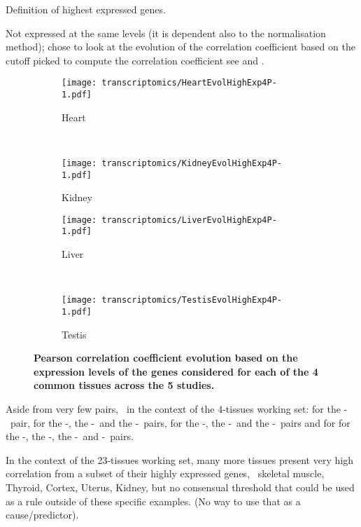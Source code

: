 Definition of highest expressed genes.

Not expressed at the same levels (it is dependent also to the normalisation
method);
chose to look at the evolution of the correlation coefficient based on
the cutoff picked to compute the correlation coefficient see 
and .

\begin{sidewaysfigure}[htpb]
    \centering
    \begin{subfigure}[b]{0.50\textwidth}\centering
        \texttt{[image: transcriptomics/HeartEvolHighExp4P-1.pdf]}
        \caption{Heart}\label{fig:CorHighExpHeart4T}
    \end{subfigure}%
~%
    \begin{subfigure}[b]{0.50\textwidth}\centering
        \texttt{[image: transcriptomics/KidneyEvolHighExp4P-1.pdf]}
        \caption{Kidney}\label{fig:CorHighExpKidney4T}
    \end{subfigure}

    \begin{subfigure}[b]{0.50\textwidth}\centering
        \texttt{[image: transcriptomics/LiverEvolHighExp4P-1.pdf]}
        \caption{Liver}\label{fig:CorHighExpLiver4T}
    \end{subfigure}%
~%
    \begin{subfigure}[b]{0.50\textwidth}\centering
        \texttt{[image: transcriptomics/TestisEvolHighExp4P-1.pdf]}
        \caption{Testis}\label{fig:CorHighExpTestis4T}
    \end{subfigure}
    \caption[Pearson correlation coefficient evolution based on the expression
    levels of the genes considered for each of the 4 common tissues]{%
\label{fig:CorHighExp4T}\textbf{Pearson correlation coefficient evolution
    based on the expression levels of the genes considered for each of the 4
    common tissues across the 5 studies.}}
\end{sidewaysfigure}

Aside from very few pairs,
\ie\ in the context of the 4-tissues working set:
 for the \uhlen{}-\gtex\ pair,
 for the \uhlen{}-\gtex, the \castle{}-\uhlen\ and the \castle{}-\gtex\
pairs,
 for the \vt{}-\ibm, the \ibm{}-\uhlen\ and the \ibm{}-\uhlen\ pairs
and for \tissue{Testis} for the \ibm{}-\uhlen, the \vt{}-\gtex, the \vt{}-\uhlen\
and \uhlen{}-\gtex\ pairs.

In the context of the 23-tissues working set,
many more tissues present very high correlation from a subset of their highly
expressed genes, \ie\ skeletal muscle, Thyroid, Cortex, Uterus, Kidney, but
no consensual threshold that could be used as a rule outside of these specific
examples. (No way to use that as a cause/predictor).

